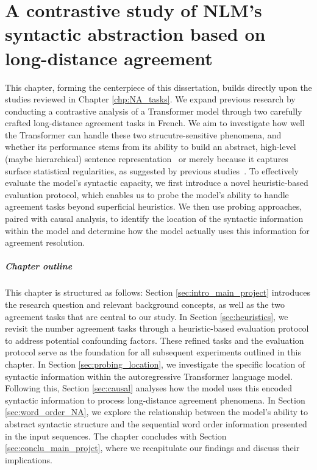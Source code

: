 \chapter{A contrastive study of NLM's syntactic abstraction based on long-distance agreement
} \label{chp:main_project}
\vspace{-1.3cm}  

\startcontents[chapters]
\printmyminitoc{
}
This chapter, forming the centerpiece of this dissertation, builds directly upon the studies reviewed in Chapter \ref{chp:NA_tasks}. We expand previous research by conducting a contrastive analysis of a Transformer model through two carefully crafted long-distance agreement tasks in French. We aim to investigate how well the Transformer can handle these two strucutre-sensitive phenomena, and whether its performance stems from its ability to build an abstract, high-level (maybe hierarchical) sentence representation~\citep{giulianelli-etal-2018-hood,lakretz-etal-2019-emergence} or merely because it captures surface statistical regularities, as suggested by previous studies~\citep{sennhauser-berwick-2018-evaluating, chaves-2020-dont,li-wisniewski-2021-neural}. To effectively evaluate the model's syntactic capacity, we first introduce a novel heuristic-based evaluation protocol, which enables us to probe the model's ability to handle agreement tasks beyond superficial heuristics. We then use probing approaches, paired with causal analysis, to identify the location of the syntactic information within the model and determine how the model actually uses this information for agreement resolution. 


\paragraph{Chapter outline} This chapter is structured as follows:
Section \ref{sec:intro_main_project} introduces the research question and relevant background concepts, as well as the two agreement tasks that are central to our study. In Section \ref{sec:heuristics}, we revisit the number agreement tasks through a heuristic-based evaluation protocol to address potential confounding factors. These refined tasks and the evaluation protocol serve as the foundation for all subsequent experiments outlined in this chapter. In Section \ref{sec:probing_location}, we investigate the specific location of syntactic information within the autoregressive Transformer language model. Following this, Section \ref{sec:causal} analyses how the model uses this encoded syntactic information to process long-distance agreement phenomena. In Section \ref{sec:word_order_NA}, we explore the relationship between the model's ability to abstract syntactic structure and the sequential word order information presented in the input sequences. The chapter concludes with Section \ref{sec:conclu_main_projct}, where we recapitulate our findings and discuss their implications.


